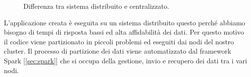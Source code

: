 \begin{figure}[H]
     \hfill
     \caption{Differenza tra sistema distribuito e centralizzato.}
  	 \label{fig:sistemaDisCent}
\end{figure}
L'applicazione creata è eseguita su un sistema distribuito questo perché abbiamo bisogno di tempi di risposta bassi ed alta affidabilità dei dati. Per questo motivo il codice viene partizionato in piccoli problemi ed eseguiti dai nodi del nostro cluster. Il processo di partizione dei dati viene automatizzato dal framework Spark [\ref{sec:spark}] che si occupa della gestione, invio e recupero dei dati tra i vari nodi. 

